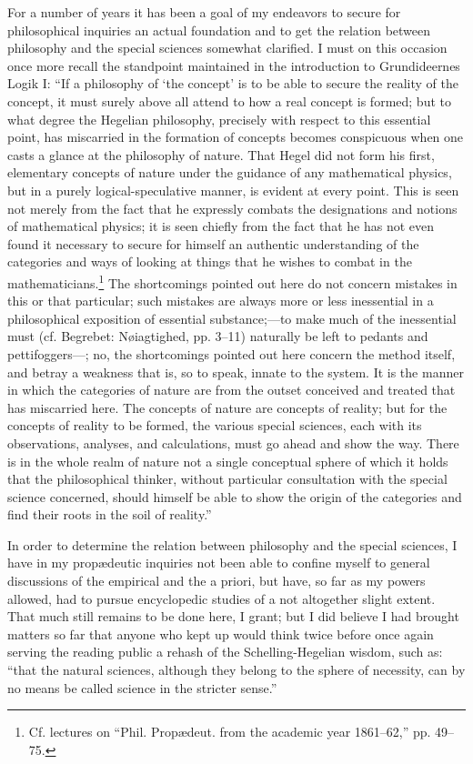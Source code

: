\documentclass[12pt]{book}
\newcommand{\opage}[1]{\marginnote{\footnotesize\textit{[#1]}}}
\begin{document}
For a number of years it has been a goal of my endeavors to secure for philosophical inquiries an actual foundation and to get the relation between philosophy and the special sciences somewhat clarified. I must on this occasion once more recall the standpoint maintained in the introduction to Grundideernes Logik I: ``If a philosophy of `the concept' is to be able to secure the reality of the concept, it must surely above all attend to how a real concept is formed; but to what degree the Hegelian philosophy, precisely with respect to this essential point, has miscarried in the formation of concepts becomes conspicuous when one casts a glance at the philosophy of nature. That Hegel did not form his first, elementary concepts of nature under the guidance of any mathematical physics, but in a purely logical-speculative manner, is evident at every point. This is seen not merely from the fact that he expressly combats the designations and notions of mathematical physics; it is seen chiefly from the fact that he has not even found it necessary to secure for himself an authentic understanding of the categories and ways of looking at things that he wishes to combat in the mathematicians.\footnote{Cf. lectures on ``Phil. Propædeut. from the academic year 1861--62,'' pp. 49--75.}
The shortcomings pointed out here do not concern mistakes in this or that particular;
\opage{112}\setcounter{footnote}{0}%
such mistakes are always more or less inessential in a philosophical exposition of essential substance;---to make much of the inessential must (cf. Begrebet: Nøiagtighed, pp. 3--11) naturally be left to pedants and pettifoggers---; no, the shortcomings pointed out here concern the method itself, and betray a weakness that is, so to speak, innate to the system. It is the manner in which the categories of nature are from the outset conceived and treated that has miscarried here. The concepts of nature are concepts of reality; but for the concepts of reality to be formed, the various special sciences, each with its observations, analyses, and calculations, must go ahead and show the way. There is in the whole realm of nature not a single conceptual sphere of which it holds that the philosophical thinker, without particular consultation with the special science concerned, should himself be able to show the origin of the categories and find their roots in the soil of reality.''

In order to determine the relation between philosophy and the special sciences, I have in my propædeutic inquiries not been able to confine myself to general discussions of the empirical and the a priori, but have, so far as my powers allowed, had to pursue encyclopedic studies of a not altogether slight extent. That much still remains to be done here, I grant; but I did believe I had brought matters so far that anyone who kept up would think twice before once again serving the reading public a rehash of the Schelling-Hegelian wisdom, such as: ``that the natural sciences, although they belong to the sphere of necessity, can by no means be called science in the stricter sense.''
\end{document}
